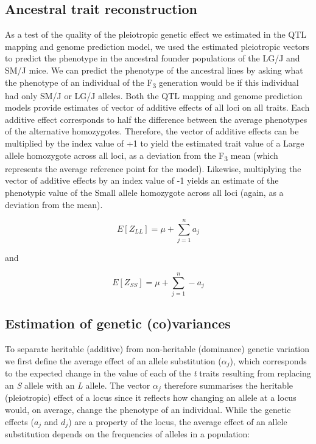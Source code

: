 \begin{refsection}
\subsection{Ancestral trait reconstruction}

As a test of the quality of the pleiotropic genetic effect we estimated
in the QTL mapping and genome prediction model, we used the estimated
pleiotropic vectors to predict the phenotype in the ancestral founder
populations of the LG/J and SM/J mice. We can predict the phenotype of
the ancestral lines by asking what the phenotype of an individual of the
F\textsubscript{3} generation would be if this individual had only SM/J
or LG/J alleles. Both the QTL mapping and genome prediction models
provide estimates of vector of additive effects of all loci on all
traits. Each additive effect corresponds to half the difference between
the average phenotypes of the alternative homozygotes. Therefore, the
vector of additive effects can be multiplied by the index value of {+1} to
yield the estimated trait value of a Large allele homozygote across all
loci, as a deviation from the F\textsubscript{3} mean (which represents
the average reference point for the model). Likewise, multiplying the
vector of additive effects by an index value of {-1} yields an estimate of
the phenotypic value of the Small allele homozygote across all loci
(again, as a deviation from the mean).

\begin{equation}
E\left\lbrack Z_{LL} \right\rbrack = \mu + \sum_{j=1}^n a_{j}
\end{equation}

and

\begin{equation}
E\left\lbrack Z_{SS} \right\rbrack = \mu + \sum_{j=1}^n -a_{j}
\end{equation}

\subsection{Estimation of genetic (co)variances}

To separate heritable (additive) from non-heritable (dominance) genetic
variation we first define the average effect of an allele substitution
(\(\alpha_{j}\)), which corresponds to the expected change in the value
of each of the \emph{t} traits resulting from replacing an \emph{S}
allele with an \emph{L} allele. The vector \(\alpha_{j}\) therefore
summarises the heritable (pleiotropic) effect of a locus since it
reflects how changing an allele at a locus would, on average, change the
phenotype of an individual. While the genetic effects (\(a_{j}\) and
\(d_{j}\)) are a property of the locus, the average effect of an allele
substitution depends on the frequencies of alleles in a population:


\end{refsection}
